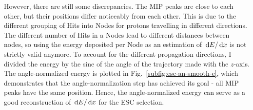    However, there are still some discrepancies. 
   The MIP peaks are close to each other, but their positions differ noticeably from each other.
   This is due to the different grouping of Hits into Nodes for protons travelling in different directions.
   The different number of Hits in a Nodes lead to different distances between nodes, so using the energy deposited per Node as an estimation of $\,\textrm{d}E/\,\textrm{d}x$ is not strictly valid anymore.
   To account for the different propagation directions, I divided the energy by the sine of the angle of the trajectory made with the $z$-axis.
   The angle-normalized energy is plotted in Fig.~\ref{subfig:esc-an-smooth-e}, which demonstrates that the angle-normalization step has achieved its goal - all MIP peaks have the same position.
   Hence, the angle-normalized energy can serve as a good reconstruction of $\,\textrm{d}E/\,\textrm{d}x$ for the ESC selection.

